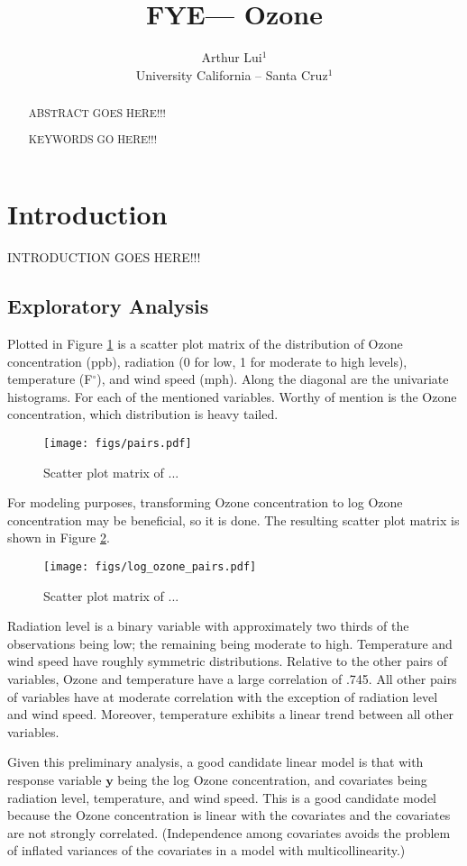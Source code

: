 \documentclass{../../tex_template/asaproc}
\title{FYE--- Ozone}
\author{
  Arthur Lui$^1$\\
  University California -- Santa Cruz$^1$\\
}
\newcommand{\y}{\bm y}
\begin{document}
\maketitle
\begin{abstract}
ABSTRACT GOES HERE!!!
\begin{keywords}
KEYWORDS GO HERE!!!
\end{keywords}
\end{abstract}

\section{Introduction}
INTRODUCTION GOES HERE!!!

\subsection{Exploratory Analysis}
Plotted in Figure \ref{fig:pairs} is a scatter plot matrix of the distribution of 
Ozone concentration (ppb), radiation (0 for low, 1 for moderate to high levels),
temperature (F$^\circ$), and wind speed (mph). Along the diagonal are the univariate
histograms. For each of the mentioned variables. Worthy of mention is the Ozone
concentration, which distribution is heavy tailed.
\begin{figure}[H]
  \texttt{[image: figs/pairs.pdf]}
  \caption{\small Scatter plot matrix of ... }
  \label{fig:pairs}
\end{figure}
For modeling purposes, transforming Ozone concentration to log Ozone
concentration may be beneficial, so it is done.  The resulting scatter plot
matrix is shown in Figure \ref{fig:logpairs}.
\begin{figure}[H]
  \texttt{[image: figs/log\_ozone\_pairs.pdf]}
  \caption{\small Scatter plot matrix of ... }
  \label{fig:logpairs}
\end{figure}
Radiation level is a binary variable with approximately two thirds of the
observations being low; the remaining being moderate to high.  Temperature and
wind speed have roughly symmetric distributions. Relative to the other pairs of
variables, Ozone and temperature have a large correlation of .745.  All other
pairs of variables have at moderate correlation with the exception of radiation
level and wind speed. Moreover, temperature exhibits a linear trend between
all other variables.

Given this preliminary analysis, a good candidate linear model is that with
response variable $\y$ being the log Ozone concentration, and covariates being
radiation level, temperature, and wind speed. This is a good candidate model
because the Ozone concentration is linear with the covariates and the 
covariates are not strongly correlated. (Independence among covariates avoids
the problem of inflated variances of the covariates in a model with
multicollinearity.)
\end{document}
